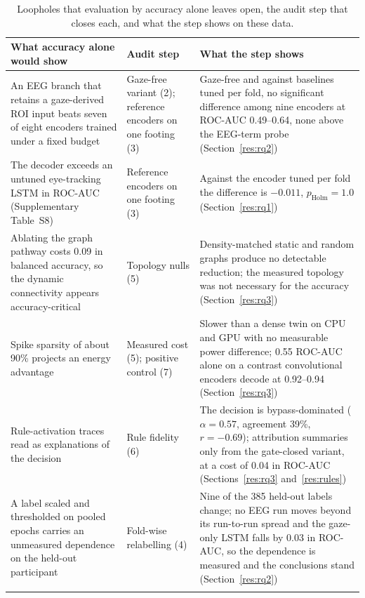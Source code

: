 \begin{table}[!htbp]
\caption{Loopholes that evaluation by accuracy alone leaves open, the audit step that closes each, and what the step shows on these data.}\label{tab:loopholes}
\footnotesize
\begin{tabular*}{\textwidth}{@{\extracolsep{\fill}}p{}p{}p{}@{}}
\toprule
What accuracy alone would show & Audit step & What the step shows \\
\midrule
An EEG branch that retains a gaze-derived ROI input beats seven of eight encoders trained under a fixed budget & Gaze-free variant (2); reference encoders on one footing (3) & Gaze-free and against baselines tuned per fold, no significant difference among nine encoders at ROC-AUC 0.49--0.64, none above the EEG-term probe (Section~\ref{res:rq2}) \\
The decoder exceeds an untuned eye-tracking LSTM in ROC-AUC (Supplementary Table~S8) & Reference encoders on one footing (3) & Against the encoder tuned per fold the difference is $-0.011$, $p_{\mathrm{Holm}}=1.0$ (Section~\ref{res:rq1}) \\
Ablating the graph pathway costs 0.09 in balanced accuracy, so the dynamic connectivity appears accuracy-critical & Topology nulls (5) & Density-matched static and random graphs produce no detectable reduction; the measured topology was not necessary for the accuracy (Section~\ref{res:rq3}) \\
Spike sparsity of about 90\% projects an energy advantage & Measured cost (5); positive control (7) & Slower than a dense twin on CPU and GPU with no measurable power difference; 0.55 ROC-AUC alone on a contrast convolutional encoders decode at 0.92--0.94 (Section~\ref{res:rq3}) \\
Rule-activation traces read as explanations of the decision & Rule fidelity (6) & The decision is bypass-dominated ($\alpha=0.57$, agreement 39\%, $r=-0.69$); attribution summaries only from the gate-closed variant, at a cost of 0.04 in ROC-AUC (Sections~\ref{res:rq3} and~\ref{res:rules}) \\
A label scaled and thresholded on pooled epochs carries an unmeasured dependence on the held-out participant & Fold-wise relabelling (4) & Nine of the 385 held-out labels change; no EEG run moves beyond its run-to-run spread and the gaze-only LSTM falls by 0.03 in ROC-AUC, so the dependence is measured and the conclusions stand (Section~\ref{res:rq2}) \\
\botrule
\end{tabular*}
\end{table}

